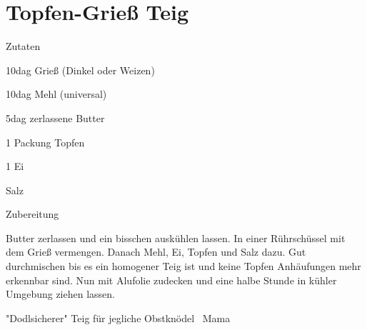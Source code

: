 \chapter*{Topfen-Grieß Teig}
\begin{multicols}{2}
 {\Large Zutaten}
 \begin{Zutaten}
		\item 10dag Grieß \left(Dinkel oder Weizen\right) 
		\item 10dag Mehl \left(universal\right) 
		\item 5dag zerlassene Butter
		\item 1 Packung Topfen
		\item 1 Ei
		\item Salz
		
\end{Zutaten}
\columnbreak
{}
\end{multicols}

{\Large Zubereitung} \newline
\begin{addmargin}[1cm]{0cm}
	Butter zerlassen und ein bisschen auskühlen lassen. In einer Rührschüssel mit dem Grieß vermengen.\newline
	Danach Mehl, Ei, Topfen und Salz dazu. Gut durchmischen bis es ein homogener Teig ist und keine
	Topfen Anhäufungen mehr erkennbar sind.\newline
	Nun mit Alufolie zudecken und eine halbe Stunde in kühler Umgebung ziehen lassen.\newline
	
	"Dodlsicherer" Teig für jegliche Obstknödel ~Mama
	
\end{addmargin}

